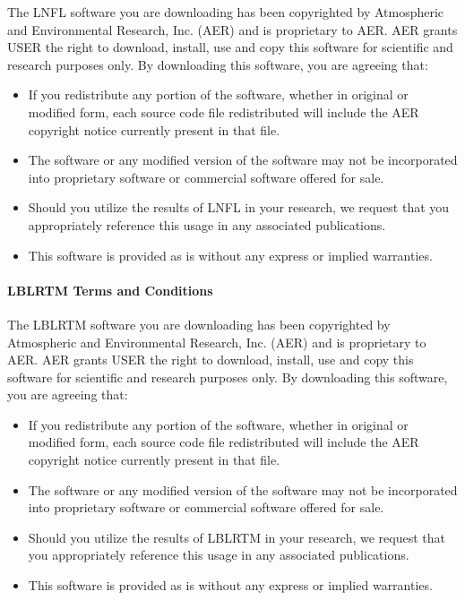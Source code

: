 The LNFL software you are downloading has been copyrighted by Atmospheric and
Environmental Research, Inc. (AER) and is proprietary to AER. AER grants USER
the right to download, install, use and copy this software for scientific and
research purposes only. By downloading this software, you are agreeing that:
\begin{itemize}
\item If you redistribute any portion of the software, whether in original or
modified form, each source code file redistributed will include the AER
copyright notice currently present in that file.
\item The software or any modified version of the software may not be
incorporated into proprietary software or commercial software offered for sale.
\item Should you utilize the results of LNFL in your research, we request that
you appropriately reference this usage in any associated publications.
\item This software is provided as is without any express or implied
warranties.
\end{itemize}

\paragraph*{LBLRTM Terms and Conditions}

The LBLRTM software you are downloading has been copyrighted by Atmospheric and
Environmental Research, Inc. (AER) and is proprietary to AER. AER grants USER
the right to download, install, use and copy this software for scientific and
research purposes only. By downloading this software, you are agreeing that:
\begin{itemize}
\item If you redistribute any portion of the software, whether in original or
modified form, each source code file redistributed will include the AER
copyright notice currently present in that file.
\item The software or any modified version of the software may not be
incorporated into proprietary software or commercial software offered for sale.
\item Should you utilize the results of LBLRTM in your research, we request
that you appropriately reference this usage in any associated publications.
\item This software is provided as is without any express or implied
warranties.
\end{itemize}

